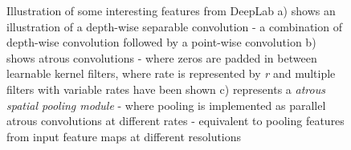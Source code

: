 \begin{figure}[!ht]
{}

\caption[Features of Deeplab ] {Illustration of some interesting features from DeepLab a) shows an illustration of a depth-wise separable convolution - a combination of depth-wise convolution followed by a point-wise convolution \cite{DEPSEPCONV} b) shows atrous convolutions - where zeros are padded in between learnable kernel filters, where rate is represented by \textit{r} and multiple filters with variable rates have been shown \cite{ATROUSCONV} c) represents a \textit{atrous spatial pooling module} - where pooling is implemented as parallel atrous convolutions at different rates - equivalent to pooling features from input feature maps at different resolutions \cite{Artacho2019WaterfallAS}}
\label{fig:features_deeplab}
\end{figure}

